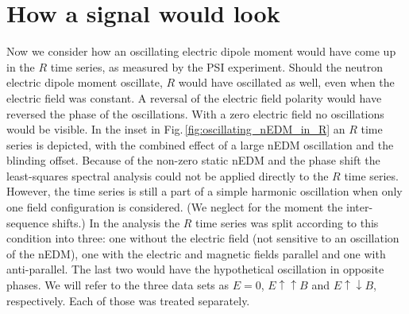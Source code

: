 







\section{How a signal would look}
Now we consider how an oscillating electric dipole moment would have come up in the $R$ time series, as measured by the PSI experiment.
Should the neutron electric dipole moment oscillate, $R$ would have oscillated as well, even when the electric field was constant. A reversal of the electric field polarity would have reversed the phase of the oscillations. With a zero electric field no oscillations would be visible. In the inset in Fig.\,\ref{fig:oscillating_nEDM_in_R} an $R$ time series is depicted, with the combined effect of a large nEDM oscillation and the blinding offset.
Because of the non-zero static nEDM and the phase shift the least-squares spectral analysis could not be applied directly to the $R$ time series. However, the time series is still a part of a simple harmonic oscillation when only one field configuration is considered. (We neglect for the moment the inter-sequence shifts.) In the analysis the $R$ time series was split according to this condition into three: one without the electric field (not sensitive to an oscillation of the nEDM), one with the electric and magnetic fields parallel and one with anti-parallel. The last two would have the hypothetical oscillation in opposite phases. We will refer to the three data sets as $E=0$, $E \uparrow \uparrow B$ and $E \uparrow \downarrow B$, respectively. Each of those was treated separately.

